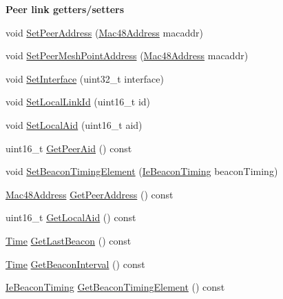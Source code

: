 \begin{Indent}{\bf Peer link getters/setters}\par
\begin{DoxyCompactItemize}
\item 
void \hyperlink{classns3_1_1dot11s_1_1PeerLink_a887baff8f9a006f00930f34760509d96}{Set\+Peer\+Address} (\hyperlink{classns3_1_1Mac48Address}{Mac48\+Address} macaddr)
\item 
void \hyperlink{classns3_1_1dot11s_1_1PeerLink_a9ce4a178c8bbd3e7f64907104abe6c0e}{Set\+Peer\+Mesh\+Point\+Address} (\hyperlink{classns3_1_1Mac48Address}{Mac48\+Address} macaddr)
\item 
void \hyperlink{classns3_1_1dot11s_1_1PeerLink_af0f8299ffb8ee48575a910a7f79faebb}{Set\+Interface} (uint32\+\_\+t interface)
\item 
void \hyperlink{classns3_1_1dot11s_1_1PeerLink_a605cbd53c90dfe2d85b21560e06fac52}{Set\+Local\+Link\+Id} (uint16\+\_\+t id)
\item 
void \hyperlink{classns3_1_1dot11s_1_1PeerLink_a67a90232f1c847b88567342b2f26088e}{Set\+Local\+Aid} (uint16\+\_\+t aid)
\item 
uint16\+\_\+t \hyperlink{classns3_1_1dot11s_1_1PeerLink_a9818806b96b43329150791970692943f}{Get\+Peer\+Aid} () const 
\item 
void \hyperlink{classns3_1_1dot11s_1_1PeerLink_a8a2203cb5c49f0e291a58d1690ae545d}{Set\+Beacon\+Timing\+Element} (\hyperlink{classns3_1_1dot11s_1_1IeBeaconTiming}{Ie\+Beacon\+Timing} beacon\+Timing)
\item 
\hyperlink{classns3_1_1Mac48Address}{Mac48\+Address} \hyperlink{classns3_1_1dot11s_1_1PeerLink_a33a86fb6d1147e9d4f0050c3cda730d2}{Get\+Peer\+Address} () const 
\item 
uint16\+\_\+t \hyperlink{classns3_1_1dot11s_1_1PeerLink_aa4ae3b9a2dee0f12d6ecacd3e8457967}{Get\+Local\+Aid} () const 
\item 
\hyperlink{classns3_1_1Time}{Time} \hyperlink{classns3_1_1dot11s_1_1PeerLink_aaeeb6458be2219f1ff33e45aede415f3}{Get\+Last\+Beacon} () const 
\item 
\hyperlink{classns3_1_1Time}{Time} \hyperlink{classns3_1_1dot11s_1_1PeerLink_a4bd9075e772f1aa86a90473fe7b8ee67}{Get\+Beacon\+Interval} () const 
\item 
\hyperlink{classns3_1_1dot11s_1_1IeBeaconTiming}{Ie\+Beacon\+Timing} \hyperlink{classns3_1_1dot11s_1_1PeerLink_a2405589445f30738a4f29fd31e65ab47}{Get\+Beacon\+Timing\+Element} () const 
\end{DoxyCompactItemize}
\end{Indent}
